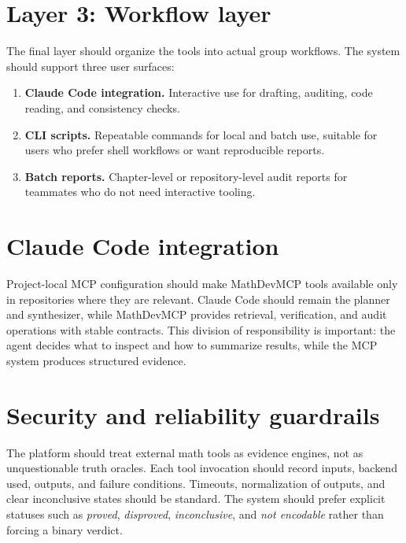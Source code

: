 \section{Layer 3: Workflow layer}

The final layer should organize the tools into actual group workflows. The system should support three user surfaces:

\begin{enumerate}[label=\arabic*.]
  \item \textbf{Claude Code integration.} Interactive use for drafting, auditing, code reading, and consistency checks.
  \item \textbf{CLI scripts.} Repeatable commands for local and batch use, suitable for users who prefer shell workflows or want reproducible reports.
  \item \textbf{Batch reports.} Chapter-level or repository-level audit reports for teammates who do not need interactive tooling.
\end{enumerate}

\section{Claude Code integration}

Project-local MCP configuration should make MathDevMCP tools available only in repositories where they are relevant. Claude Code should remain the planner and synthesizer, while MathDevMCP provides retrieval, verification, and audit operations with stable contracts. This division of responsibility is important: the agent decides what to inspect and how to summarize results, while the MCP system produces structured evidence.

\section{Security and reliability guardrails}

The platform should treat external math tools as evidence engines, not as unquestionable truth oracles. Each tool invocation should record inputs, backend used, outputs, and failure conditions. Timeouts, normalization of outputs, and clear inconclusive states should be standard. The system should prefer explicit statuses such as \emph{proved}, \emph{disproved}, \emph{inconclusive}, and \emph{not encodable} rather than forcing a binary verdict.
